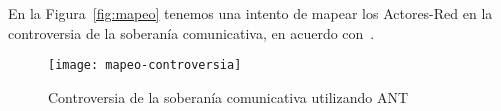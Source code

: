 En la Figura~\vref{fig:mapeo} tenemos una intento de mapear los Actores-Red en la controversia de la soberanía comunicativa, en acuerdo con~\autocite{Venturini2010a}.

\begin{sidewaysfigure}
  \centering
  \texttt{[image: mapeo-controversia]}
  \caption[Mapeo]{Controversia de la soberanía comunicativa utilizando ANT} %
  \label{fig:mapeo}
\end{sidewaysfigure}




